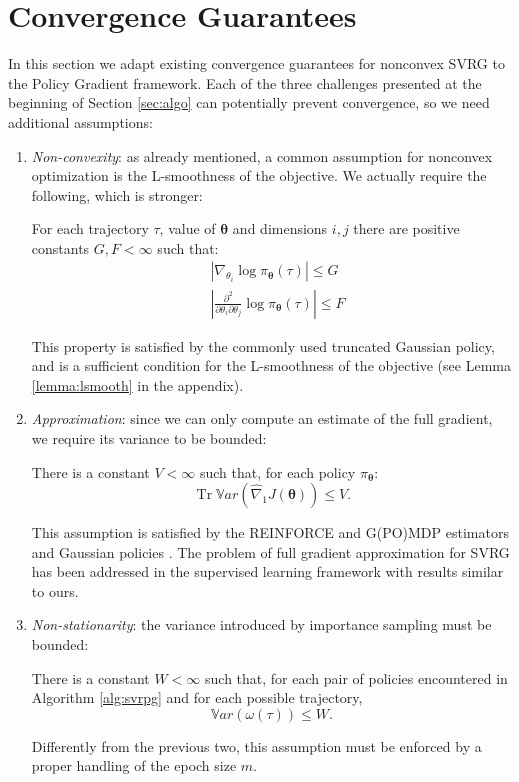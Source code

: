 \documentclass{article}
\theoremstyle{remark}
\theoremstyle{definition}
\DeclareMathOperator{\Tr}{Tr}
\newcommand{\vtheta}{\boldsymbol{\theta}}
\newcommand{\pol}{\pi_{\vtheta}}
\newcommand{\gradApp}[2]{\hat{\nabla}_{#2}J(#1)}
\newcommand{\VARRF}{V}
\newcommand{\GRADLOG}{G}
\newcommand{\VARIS}{W}
\newcommand{\HESSLOG}{F}
\begin{document}
\section{Convergence Guarantees}
In this section we adapt existing convergence guarantees for nonconvex SVRG \cite{reddi2016stochastic} \cite{allen2016variance} to the Policy Gradient framework.
Each of the three challenges presented at the beginning of Section \ref{sec:algo} can potentially prevent convergence, so we need additional assumptions:
\begin{enumerate}
\item \textit{Non-convexity}:
	as already mentioned, a common assumption for nonconvex optimization is the L-smoothness of the objective. We actually require the following, which is stronger:
	\begin{assumption}\label{ass:bounded_score}
		For each trajectory $\tau$, value of $\vtheta$ and dimensions $i,j$ there are positive constants $G,F<\infty$ such that:
		\begin{align*}
		&\left|\nabla_{\theta_i}\log\pi_{\vtheta}(\tau)\right| \leq \GRADLOG \\
		&\left|\frac{\partial^2}{\partial\theta_i\partial\theta_j}\log\pi_{\vtheta}(\tau)\right| \leq \HESSLOG
		\end{align*}
	\end{assumption}
	This property is satisfied by the commonly used truncated Gaussian policy, and is a sufficient condition for the L-smoothness of the objective (see Lemma \ref{lemma:lsmooth} in the appendix).
\item \textit{Approximation}:
since we can only compute an estimate of the full gradient, we require its variance to be bounded:
	\begin{assumption}\label{ass:REINFORCE}
		There is a constant $V<\infty$ such that, for each policy $\pol$:
		\[
		\Tr\mathbb{V}ar\left(\gradApp{\vtheta}{1}\right) \leq \VARRF.
		\]
	\end{assumption}
This assumption is satisfied by the REINFORCE and G(PO)MDP estimators and Gaussian policies \cite{zhao2011analysis} \cite{pirotta2013adaptive}. The problem of full gradient approximation for SVRG has been addressed in the supervised learning framework \cite{harikandeh2015stopwasting} with results similar to ours.
\item \textit{Non-stationarity}:
the variance introduced by importance sampling must be bounded:
	\begin{assumption}\label{ass:M2}
		There is a constant $W<\infty$ such that, for each pair of policies encountered in Algorithm \ref{alg:svrpg} and for each possible trajectory,
		\[
		\mathbb{V}ar\left(\omega(\tau)\right) \leq \VARIS.
		\]
	\end{assumption}
Differently from the previous two, this assumption must be enforced by a proper handling of the epoch size $m$.
\end{enumerate}
\end{document}
